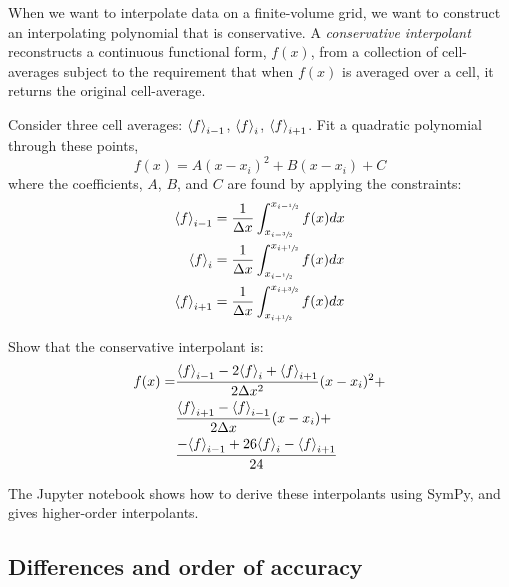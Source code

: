When we want to interpolate data on a finite-volume grid, we want to
construct an interpolating polynomial that is conservative.  A {\em
  conservative interpolant} reconstructs a continuous functional form,
$f(x)$, from a collection of cell-averages subject to the requirement
that when $f(x)$ is averaged over a cell, it returns the original
cell-average.

\begin{exercise}
{\label{ex:consinterp}

Consider three cell averages: ${\langle f\rangle}_{i-1}$, ${\langle f\rangle}_{i}$, ${\langle f\rangle}_{i+1}$.  Fit a quadratic polynomial through these points,
 \begin{equation}
 f(x) = A (x - x_i)^2 + B (x - x_i) + C
 \end{equation}
 where the coefficients, $A$, $B$, and $C$ are found by applying the constraints:
 \begin{align}
 {\langle f\rangle}_{i-1} &= \frac{1}{\Delta x}
      \int_{x_{i-\sfrac{3}{2}}}^{x_{i-{\sfrac{1}{2}}}} f(x) dx \\
 {\langle f\rangle}_{i} &= \frac{1}{\Delta x}
      \int_{x_{i-{\sfrac{1}{2}}}}^{x_{i+{\sfrac{1}{2}}}} f(x) dx \\
 {\langle f\rangle}_{i+1} &= \frac{1}{\Delta x}
      \int_{x_{i+{\sfrac{1}{2}}}}^{x_{i+\sfrac{3}{2}}} f(x) dx
 \end{align}

Show that the conservative interpolant is:
\begin{align}
f(x) = &\frac{{\langle f\rangle}_{i-1} - 2 {\langle f\rangle}_i +
             {\langle f\rangle}_{i+1}}{2\Delta x^2} (x-x_i)^2 + \nonumber \\
       &\frac{{\langle f\rangle}_{i+1} - {\langle f\rangle}_{i-1}}
            {2\Delta x} (x-x_i) + \nonumber \\
       &\frac{-{\langle f\rangle}_{i-1} + 26 {\langle f\rangle}_i
             -{\langle f\rangle}_{i+1}}{24}
\end{align}
}
\end{exercise}

The {\sf Jupyter} notebook
shows how to derive these interpolants using {\sf SymPy}, and gives
higher-order interpolants.


\subsection{Differences and order of accuracy}

